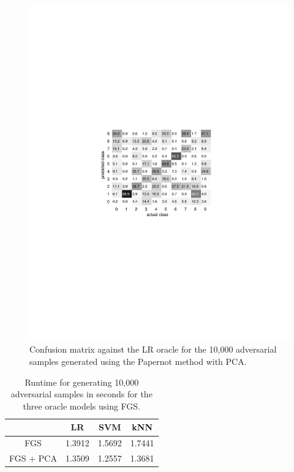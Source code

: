 \begin{figure}
    \centering
    \includegraphics[width =0.97\linewidth, trim = 120 295 150 280, clip]{figs/confusion_matrix_papernotpca.pdf}
    \caption{Confusion matrix against the LR oracle for the 10,000 adversarial samples generated using the Papernot method with PCA.}
    \label{fig:confusion_matrix_papernotpca}
\end{figure}

\begin{table}
\centering
\begin{tabular}{c|ccc}
\toprule
&LR & SVM & kNN \\
\midrule
FGS & 1.3912 & 1.5692 & 1.7441 \\
FGS + PCA & 1.3509 & 1.2557 & 1.3681\\
\bottomrule
\end{tabular}
   \caption{Runtime for generating 10,000 adversarial samples in seconds for the three oracle models using FGS.}
    \label{runtime_FGS}
\end{table}

